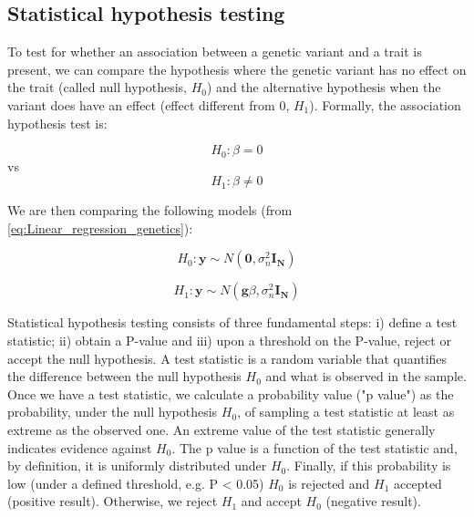 
\newpage

\subsection{Statistical hypothesis testing}

To test for whether an association between a genetic variant and a trait is present, we can compare the hypothesis where the genetic variant has no effect on the trait (called null hypothesis, $H_0$) and the alternative hypothesis when the variant does have an effect (effect different from 0, $H_1$).
Formally, the association hypothesis test is:

\begin{equation}\label{eq:null_hypothesis}
 H_{0}: \beta=0 
\end{equation}
vs
\begin{equation}\label{eq:alternative_hypothesis}
 H_{1}: \beta \neq 0 
\end{equation}

We are then comparing the following models (from \eqref{eq:Linear_regression_genetics}):

\begin{equation}\label{eq16:null_hypothesis_regression}
 H_0: \mathbf{y} \sim N(\mathbf{0}, \sigma_n^{2} \mathbf{I_N}) 
\end{equation}

\begin{equation}\label{eq17:alternative_hypothesis_regression}
 H_1: \mathbf{y} \sim N(\mathbf{g}\beta,\sigma_n^{2} \mathbf{I_N}) 
\end{equation}

Statistical hypothesis testing consists of three fundamental steps: i) define a test statistic; ii) obtain a P-value and iii) upon a threshold on the P-value, reject or accept the null hypothesis. 
A test statistic is a random variable that quantifies the difference between the null hypothesis $H_0$ and what is observed in the sample. 
Once we have a test statistic, we calculate a probability value ("p value") as the probability, under the null hypothesis $H_0$, of sampling a test statistic at least as extreme as the observed one. 
An extreme value of the test statistic generally indicates evidence against $H_0$.
The p value is a function of the test statistic and, by definition, it is uniformly distributed under $H_0$.
Finally, if this probability is low (under a defined threshold, e.g. P < 0.05) $H_0$ is rejected and $H_1$ accepted (positive result).
Otherwise, we reject $H_1$ and accept $H_0$ (negative result).\\

